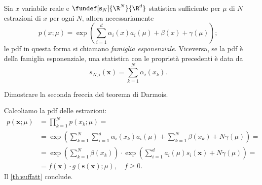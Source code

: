 \begin{fact}
	Sia $x$ variabile reale e $\fundef[\mathbf s_N]{\R^N}{\R^d}$ statistica sufficiente per $\mu$ di $N$ estrazioni di $x$ per ogni $N$,
	allora necessariamente
	\begin{equation*}
		p(x;\mu) =
		\exp \left( \sum_{i=1}^d \alpha_i(x)a_i(\mu) + \beta(x) + \gamma(\mu) \right);
	\end{equation*}
	le pdf in questa forma si chiamano \emph{famiglia esponenziale}.
	Viceversa, se la pdf è della famiglia esponenziale, una statistica con le proprietà precedenti è data da
	\begin{equation*}
		s_{N,i}(\mathbf x) = \sum_{k=1}^{N} \alpha_i(x_k).
	\end{equation*}
\end{fact}

\begin{exercise}
	Dimostrare la seconda freccia del teorema di Darmois.
\end{exercise}

\begin{solution}
	Calcoliamo la pdf delle estrazioni:
	\begin{align*}
		p(\mathbf x;\mu)
		&= \prod_{k=1}^N p(x_k;\mu) = \\
		&= \exp \left( \sum_{k=1}^N \sum_{i=1}^d \alpha_i(x_k)a_i(\mu)
		+ \sum_{k=1}^N \beta(x_k) + N\gamma(\mu) \right) = \\
		&= \exp \left( \sum_{k=1}^N \beta(x_k) \right)
		\cdot \exp \left( \sum_{i=1}^d a_i(\mu)s_i(\mathbf x) + N\gamma(\mu) \right) = \\
		&= f(\mathbf x) \cdot g(\mathbf s(\mathbf x);\mu), \quad f\ge0.
	\end{align*}
	Il \autoref{th:suffatt} conclude.
\end{solution}
